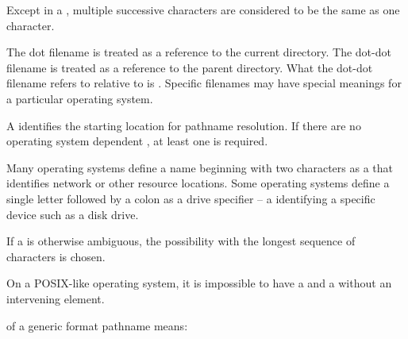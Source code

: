 \pnum
Except in a ,
multiple successive  characters are considered to
be the same as one  character.

\pnum
The dot filename is treated as a reference to the current directory.
The dot-dot filename is treated as a reference to the parent directory.
What the dot-dot filename refers to
relative to  is .
Specific filenames may have special meanings for a particular operating system.

\pnum
A  identifies the
starting location for pathname resolution.
If there are no operating system dependent ,
at least one \impldefrootname{}  is required.
\begin{note} Many operating systems define a name
beginning with two  characters
as a  that identifies
network or other resource locations.
Some operating systems
define a single letter followed by a colon
as a drive specifier -- a 
identifying a specific device such as a disk drive.
\end{note}

\pnum
If a  is otherwise ambiguous,
the possibility with the longest sequence of characters is chosen.
\begin{note}
On a POSIX-like operating system, it is impossible to have a
 and a 
without an intervening  element.
\end{note}

\pnum
{}%
 of a generic format pathname means:

